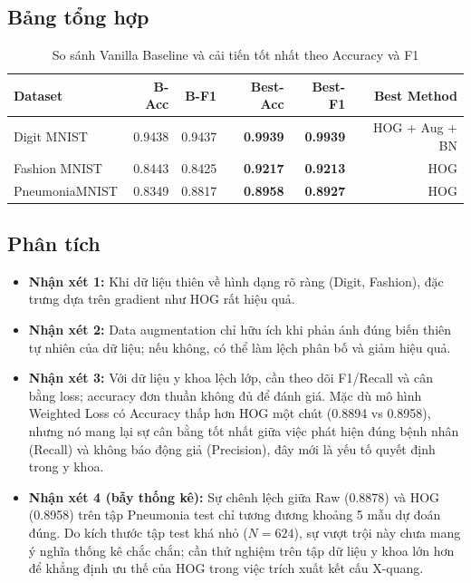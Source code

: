 \documentclass[a4paper,12pt]{report}
\begin{document}
\subsection{Bảng tổng hợp}
\begin{table}[H]
    \centering
    \caption{So sánh Vanilla Baseline và cải tiến tốt nhất theo Accuracy và F1}
    \label{tab:compare-best}
    \begin{tabular}{lrrrrr}
        \toprule
        \textbf{Dataset} & \textbf{B-Acc} & \textbf{B-F1} & \textbf{Best-Acc} & \textbf{Best-F1} & \textbf{Best Method} \\
        \midrule
        Digit MNIST & 0.9438 & 0.9437 & \textbf{0.9939} & \textbf{0.9939} & HOG + Aug + BN \\
        Fashion MNIST & 0.8443 & 0.8425 & \textbf{0.9217} & \textbf{0.9213} & HOG \\
        PneumoniaMNIST & 0.8349 & 0.8817 & \textbf{0.8958} & \textbf{0.8927} & HOG \\
        \bottomrule
    \end{tabular}
\end{table}

\subsection{Phân tích}

\begin{itemize}
    \item \textbf{Nhận xét 1:} Khi dữ liệu thiên về hình dạng rõ ràng (Digit, Fashion), đặc trưng dựa trên gradient như HOG rất hiệu quả.
    
    \item \textbf{Nhận xét 2:} Data augmentation chỉ hữu ích khi phản ánh đúng biến thiên tự nhiên của dữ liệu; nếu không, có thể làm lệch phân bố và giảm hiệu quả.
    
    \item \textbf{Nhận xét 3:} Với dữ liệu y khoa lệch lớp, cần theo dõi F1/Recall và cân bằng loss; accuracy đơn thuần không đủ để đánh giá. Mặc dù mô hình Weighted Loss có Accuracy thấp hơn HOG một chút (0.8894 vs 0.8958), nhưng nó mang lại sự cân bằng tốt nhất giữa việc phát hiện đúng bệnh nhân (Recall) và không báo động giả (Precision), đây mới là yếu tố quyết định trong y khoa.

    \item \textbf{Nhận xét 4 (bẫy thống kê):} Sự chênh lệch giữa Raw (0.8878) và HOG (0.8958) trên tập Pneumonia test chỉ tương đương khoảng 5 mẫu dự đoán đúng. Do kích thước tập test khá nhỏ ($N=624$), sự vượt trội này chưa mang ý nghĩa thống kê chắc chắn; cần thử nghiệm trên tập dữ liệu y khoa lớn hơn để khẳng định ưu thế của HOG trong việc trích xuất kết cấu X-quang.
\end{itemize}
\end{document}

